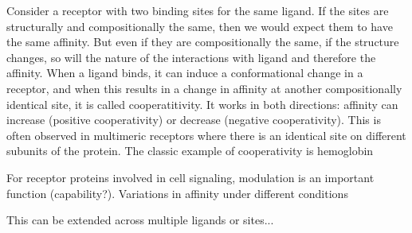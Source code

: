 \documentclass{article}
\numberwithin{equation}{section}
\begin{document}
Consider a receptor with two binding sites for the same ligand. If the sites are structurally and compositionally the same, then we would expect them to have the same affinity. But even if they are compositionally the same, if the structure changes, so will the nature of the interactions with ligand and therefore the affinity. When a ligand binds, it can induce a conformational change in a receptor, and when this results in a change in affinity at another compositionally identical site, it is called cooperatitivity. It works in both directions: affinity can increase (positive cooperativity) or decrease (negative cooperativity). This is often observed in multimeric receptors where there is an identical site on different subunits of the protein. The classic example of cooperativity is hemoglobin

For receptor proteins involved in cell signaling, modulation is an important function (capability?). Variations in affinity under different conditions 

This can be extended across multiple ligands or sites...

 
\end{document}
